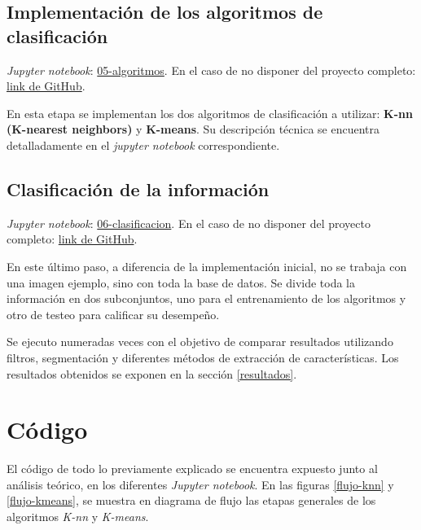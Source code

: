 \documentclass[10pt,a4paper]{article}
\begin{document}
\subsection{Implementación de los algoritmos de clasificación}
\textit{Jupyter notebook}: \href{./05-algoritmos.ipynb}{05-algoritmos}. En el caso de no disponer del proyecto completo: \href{https://github.com/FernandezGFG/fruit-classifier/blob/master/05-algoritmos.ipynb}{link de GitHub}.

En esta etapa se implementan los dos algoritmos de clasificación a utilizar: \textbf{K-nn (K-nearest neighbors)} y \textbf{K-means}. Su descripción técnica se encuentra detalladamente en el \textit{jupyter notebook} correspondiente.

\subsection{Clasificación de la información}
\textit{Jupyter notebook}: \href{./06-clasificacion.ipynb}{06-clasificacion}. En el caso de no disponer del proyecto completo: \href{https://github.com/FernandezGFG/fruit-classifier/blob/master/06-clasificacion.ipynb}{link de GitHub}.

En este último paso, a diferencia de la implementación inicial, no se trabaja con una imagen ejemplo, sino con toda la base de datos. Se divide toda la información en dos subconjuntos, uno para el entrenamiento de los algoritmos y otro de testeo para calificar su desempeño.

Se ejecuto numeradas veces con el objetivo de comparar resultados utilizando filtros, segmentación y diferentes métodos de extracción de características. Los resultados obtenidos se exponen en la sección \ref{resultados}.

\section{Código}
El código de todo lo previamente explicado se encuentra expuesto junto al análisis teórico, en los diferentes \textit{Jupyter notebook}. En las figuras \ref{flujo-knn} y \ref{flujo-kmeans}, se muestra en diagrama de flujo las etapas generales de los algoritmos \textit{K-nn} y \textit{K-means}.
\end{document}
